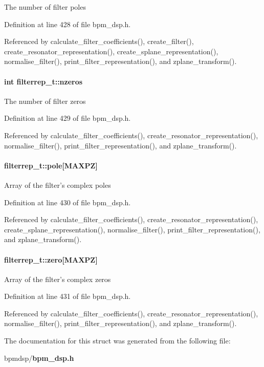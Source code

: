 The number of filter poles 

Definition at line 428 of file bpm\_\-dsp.h.

Referenced by calculate\_\-filter\_\-coefficients(), create\_\-filter(), create\_\-resonator\_\-representation(), create\_\-splane\_\-representation(), normalise\_\-filter(), print\_\-filter\_\-representation(), and zplane\_\-transform().
\paragraph[nzeros]{\setlength{\rightskip}{0pt plus 5cm}int {\bf filterrep\_\-t::nzeros}}\hfill\label{structfilterrep__t_c3b88e769143d340f94320a2096170ae}


The number of filter zeros 

Definition at line 429 of file bpm\_\-dsp.h.

Referenced by calculate\_\-filter\_\-coefficients(), create\_\-resonator\_\-representation(), normalise\_\-filter(), print\_\-filter\_\-representation(), and zplane\_\-transform().
\paragraph[pole]{ {\bf filterrep\_\-t::pole}[MAXPZ]}\hfill\label{structfilterrep__t_6e09dea05781f890ca586f44a23811b4}


Array of the filter's complex poles 

Definition at line 430 of file bpm\_\-dsp.h.

Referenced by calculate\_\-filter\_\-coefficients(), create\_\-resonator\_\-representation(), create\_\-splane\_\-representation(), normalise\_\-filter(), print\_\-filter\_\-representation(), and zplane\_\-transform().
\paragraph[zero]{ {\bf filterrep\_\-t::zero}[MAXPZ]}\hfill\label{structfilterrep__t_41c194dbef24dc71cd25a7cd9821c7ac}


Array of the filter's complex zeros 

Definition at line 431 of file bpm\_\-dsp.h.

Referenced by calculate\_\-filter\_\-coefficients(), create\_\-resonator\_\-representation(), normalise\_\-filter(), print\_\-filter\_\-representation(), and zplane\_\-transform().

The documentation for this struct was generated from the following file:\begin{CompactItemize}
\item 
bpmdsp/{\bf bpm\_\-dsp.h}\end{CompactItemize}
